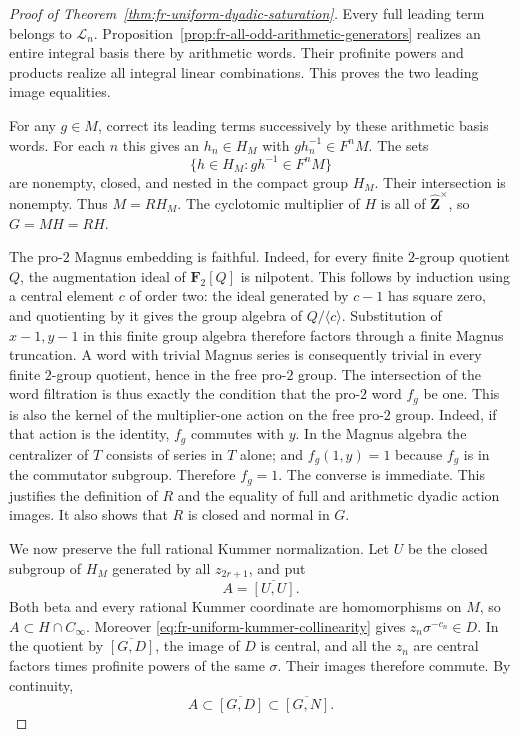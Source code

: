 \begin{proof}[Proof of Theorem~\ref{thm:fr-uniform-dyadic-saturation}]
Every full leading term belongs to $\mathcal L_n$.
Proposition~\ref{prop:fr-all-odd-arithmetic-generators}
realizes an entire integral basis there by arithmetic
words. Their profinite powers and products realize all
integral linear combinations. This proves the two leading
image equalities.

For any $g\in M$, correct its leading terms successively
by these arithmetic basis words. For each $n$ this gives
an $h_n\in H_M$ with $g h_n^{-1}\in F^nM$.
The sets
\[
 \{h\in H_M:g h^{-1}\in F^nM\}
\]
are nonempty, closed, and nested in the compact group
$H_M$. Their intersection is nonempty. Thus $M=RH_M$.
The cyclotomic multiplier of $H$ is all of
$\widehat{\mathbf Z}^{\times}$, so $G=MH=RH$.

The pro-$2$ Magnus embedding is faithful. Indeed, for every
finite $2$-group quotient $Q$, the augmentation ideal of
$\mathbf F_2[Q]$ is nilpotent. This follows by induction using
a central element $c$ of order two: the ideal generated by $c-1$
has square zero, and quotienting by it gives the group algebra
of $Q/\langle c\rangle$. Substitution of $x-1,y-1$ in this
finite group algebra therefore factors through a finite Magnus
truncation. A word with trivial Magnus series is consequently
trivial in every finite $2$-group quotient, hence in the free
pro-$2$ group. The intersection of the word filtration is thus
exactly the condition that the pro-$2$ word $f_g$ be one. This is also the
kernel of the multiplier-one action on the free pro-$2$
group. Indeed, if that action is the identity, $f_g$
commutes with $y$. In the Magnus algebra the centralizer
of $T$ consists of series in $T$ alone; and $f_g(1,y)=1$
because $f_g$ is in the commutator subgroup. Therefore
$f_g=1$. The converse is immediate. This justifies the
definition of $R$ and the equality of full and arithmetic
dyadic action images. It also shows that $R$ is closed
and normal in $G$.

We now preserve the full rational Kummer normalization.
Let $U$ be the closed subgroup of $H_M$ generated by all
$z_{2r+1}$, and put
\[
 A=\overline{[U,U]}.
\]
Both beta and every rational Kummer coordinate are
homomorphisms on $M$, so $A\subset H\cap C_\infty$.
Moreover \eqref{eq:fr-uniform-kummer-collinearity} gives
$z_n\sigma^{-c_n}\in D$.
In the quotient by $\overline{[G,D]}$, the image of $D$
is central, and all the $z_n$ are central factors times
profinite powers of the same $\sigma$. Their images
therefore commute. By continuity,
\begin{equation}\label{eq:fr-arithmetic-derived-in-relative-commutator}
 A\subset\overline{[G,D]}\subset\overline{[G,N]}.
\end{equation}


\end{proof}
